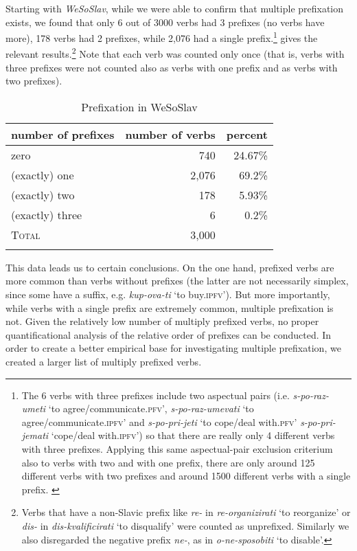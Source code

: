 \documentclass[output=paper,colorlinks,citecolor=brown]{langscibook}
\begin{document}
Starting with \textit{WeSoSlav}, while we were able to confirm that multiple prefixation exists, we found that only 6 out of 3000 verbs had 3 prefixes (no verbs have more), 178 verbs had 2 prefixes, while 2,076 had a single prefix.\footnote{The 6 verbs with three prefixes include two aspectual pairs (i.e. \textit{s-po-raz-umeti} `to agree/\-com\-mu\-nicate.\textsc{pfv}', \textit{s-po-raz-umevati} `to agree/communicate.\textsc{ipfv}' and \textit{s-po-pri-jeti} `to cope/deal with.\textsc{pfv}' \textit{s-po-pri-jemati} `cope/deal with.\textsc{ipfv}') so that there are really only 4 different verbs with three prefixes. Applying this same aspectual-pair exclusion criterium also to verbs with two and with one prefix, there are only around 125 different verbs with two prefixes and around 1500 different verbs with a single prefix. \label{fn:asppair}}  gives the relevant results.\footnote{Verbs that have a non-Slavic prefix like \textit{re-} in \textit{re-organizirati} `to reorganize' or \textit{dis-} in \textit{dis-kvalificirati} `to disqualify' were counted as unprefixed. Similarly we also disregarded the negative prefix \textit{ne-}, as in \textit{o-ne-sposobiti} `to disable'.} Note that each verb was counted only once (that is, verbs with three prefixes were not counted also as verbs with one prefix and as verbs with two prefixes).

\begin{table}[ht]
\centering 
\begin{tabular}{ l r r }
 \lsptoprule
 { number of prefixes}  &  {number of verbs}  &  {percent} \\
 \midrule
zero & 740 & 24.67\% \\ 
 (exactly) one  & 2,076 & 69.2\% \\
 (exactly) two & 178 & 5.93\% \\
 (exactly) three & 6 & 0.2\% \\
 \midrule
 \textsc{Total} & 3,000 & \\ 
 \lspbottomrule
\end{tabular}
\caption{Prefixation in WeSoSlav \citep{mar+:WeSoSlaV}}
    \label{tab:prefixWeSoSlav}
\end{table}

This data leads us to certain conclusions. On the one hand, prefixed verbs are more common than verbs without prefixes (the latter are not necessarily simplex, since some have a suffix, e.g. \textit{kup-ova-ti} `to buy.\textsc{ipfv}'). But more importantly, while verbs with a single prefix are extremely common, multiple prefixation is not. Given the relatively low number of multiply prefixed verbs, no proper quantificational analysis of the relative order of prefixes can be conducted. In order to create a better empirical base for investigating multiple prefixation, we created a larger list of multiply prefixed verbs.
\end{document}
